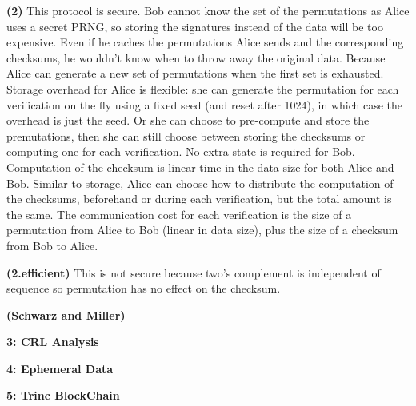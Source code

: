 \documentclass[10pt]{article}
\newcommand\question[2]{\vspace{.1in}\textbf{#1: #2}\vspace{.5em}\vspace{.10in}}
\renewcommand\part[1]{\vspace{.10in}\textbf{(#1)}}
\begin{document}
\part{2}
This protocol is secure. Bob cannot know the set of the permutations as Alice
uses a secret PRNG, so storing the signatures instead of the data will be too
expensive. Even if he caches the permutations Alice sends and the corresponding
checksums, he wouldn't know when to throw away the original data. Because Alice
can generate a new set of permutations when the first set is exhausted.
Storage overhead for Alice is flexible: she can generate the permutation 
for each verification on the fly using a fixed seed (and reset after 1024), in
which case the overhead is just the seed. Or she can choose to pre-compute and
store the premutations, then she can still choose between storing the checksums
or computing one for each verification.
No extra state is required for Bob.
Computation of the checksum is linear time in the data size for both Alice and
Bob. Similar to storage, Alice can choose how to distribute the computation of
the checksums, beforehand or during each verification, but the total amount is
the same.
The communication cost for each verification is the size of a permutation from
Alice to Bob (linear in data size), plus the size of a checksum from Bob to
Alice.

\part{2.efficient}
This is not secure because two's complement is independent of sequence so
permutation has no effect on the checksum.

\part{Schwarz and Miller}

\newpage
\question{3}{CRL Analysis}

\newpage
\question{4}{Ephemeral Data}

\newpage
\question{5}{Trinc BlockChain}
\end{document}
